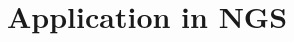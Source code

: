 \documentclass[conference]{IEEEtran} \IEEEoverridecommandlockouts
\begin{document}
\section{Application in NGS} \label{sec:ngs-appl} 
\end{document}
